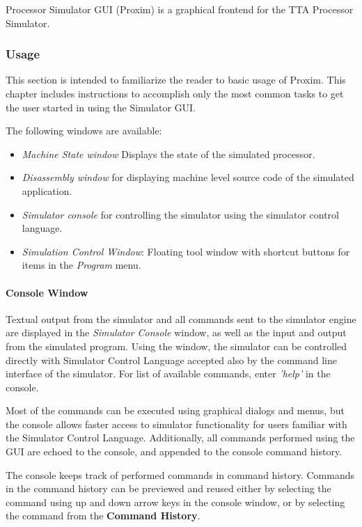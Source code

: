 \documentclass[twoside]{tceusermanual}
\begin{document}
Processor Simulator GUI (Proxim) is a graphical frontend for 
the TTA Processor Simulator.

\subsubsection{Usage}

This section is intended to familiarize the reader to basic usage of 
Proxim. This chapter includes instructions to accomplish only the most
common tasks to get the user started in using the Simulator GUI.

The following windows are available:
\begin{itemize}
\item \emph{Machine State window} Displays the state of the simulated
processor. 
\item \emph{Disassembly window} for displaying machine level source
code of the simulated application. 
\item \emph{Simulator console} for controlling the simulator using
the simulator control language. 

\item \emph{Simulation Control Window}: Floating tool window with shortcut
buttons for items in the \emph{Program} menu.
\end{itemize}

\paragraph{Console Window}

Textual output from the simulator and all commands sent to the simulator
engine are displayed in the \emph{Simulator Console} window, as well as the
input and output from the simulated program. Using the window,
the simulator can be controlled directly with Simulator Control Language
accepted also by the command line interface of the simulator. For list of
available commands, enter \emph{'help'} in the console.

Most of the commands can be executed using graphical dialogs and
menus, but the console allows faster access to simulator functionality for
users familiar with the Simulator Control Language. Additionally, all commands
performed using the GUI are echoed to the console, and appended to the
console command history.

The console keeps track of performed commands in command history. Commands in
the command history can be previewed and reused either by selecting the
command using up and down arrow keys in the console window, or by selecting
the command from the \textbf{Command History}.
\end{document}
